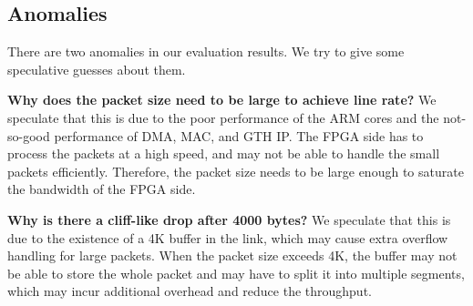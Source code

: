 \subsection{Anomalies}
There are two anomalies in our evaluation results. We try to give some speculative guesses about them.

\textbf{Why does the packet size need to be large to achieve line rate?} We speculate that this is due to the poor performance of the ARM cores and the not-so-good performance of DMA, MAC, and GTH IP. The FPGA side has to process the packets at a high speed, and may not be able to handle the small packets efficiently. Therefore, the packet size needs to be large enough to saturate the bandwidth of the FPGA side.

\textbf{Why is there a cliff-like drop after 4000 bytes?} We speculate that this is due to the existence of a 4K buffer in the link, which may cause extra overflow handling for large packets. When the packet size exceeds 4K, the buffer may not be able to store the whole packet and may have to split it into multiple segments, which may incur additional overhead and reduce the throughput.



